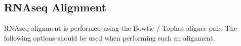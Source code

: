 \subsection{RNAseq Alignment}
RNAseq alignment is performed using the Bowtie / Tophat aligner pair. The following options should be used when performing such an alignment.

